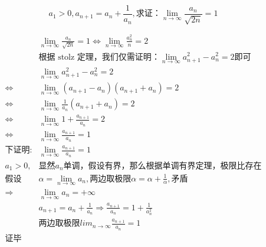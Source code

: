 \documentclass{ctexart}
\begin{document}
\fontsize{25.0pt}{\baselineskip}\selectfont

$$a_1>0, a_{n+1} = a_n + \frac{1}{a_n}, \mbox{求证：}\lim_{n\to\infty}\frac{a_n}{\sqrt{2n}} = 1$$  

\newpage
{}
\fontsize{16.0pt}{\baselineskip}\selectfont

\begin{align*}
& \lim_{n\to\infty}\frac{a_n}{\sqrt{2n}} = 1 \Longleftrightarrow \lim_{n\to\infty}\frac{a_n^2}{n} = 2\\  
&\mbox{根据 stolz 定理，我们仅需证明}：\lim_{n\to\infty}{a_{n+1}^2 - a_n^2} = 2\mbox{即可}\\
\quad &\lim_{n\to\infty}{a_{n+1}^2 - a_n^2} = 2\\
\Longleftrightarrow & \lim_{n\to\infty}{(a_{n+1} - a_n)(a_{n+1} + a_n)} = 2\\
\Longleftrightarrow & \lim_{n\to\infty}{\frac{1}{a_n}(a_{n+1} + a_n)} = 2\\
\Longleftrightarrow & \lim_{n\to\infty}{1 + \frac{a_{n+1}}{a_n}} = 2\\
\Longleftrightarrow & \lim_{n\to\infty}{\frac{a_{n+1}}{a_n}} = 1\\
\mbox{下证明:}&\lim_{n\to\infty}{\frac{a_{n+1}}{a_n}} = 1\\
a_1>0, &\mbox{显然}{a_n}\mbox{单调}， \mbox{假设有界}， 那么根据单调有界定理，极限比存在\\
\mbox{假设} &\alpha = \lim_{n\to\infty}{a_n}, \mbox{两边取极限} \alpha = \alpha + \frac{1}{\alpha}, \mbox{矛盾}\\
\Longrightarrow &\lim_{n\to\infty}{a_n} = +\infty\\
&a_{n+1} = a_n + \frac{1}{a_n} \Longrightarrow \frac{a_{n+1}}{a_n } = 1 + \frac{1}{a_n^2}\\
&\mbox{两边取极限} lim_{n\to\infty}{\frac{a_{n+1}}{a_n}} = 1\\
\mbox{证毕}\\
\end{align*}
\end{document}
